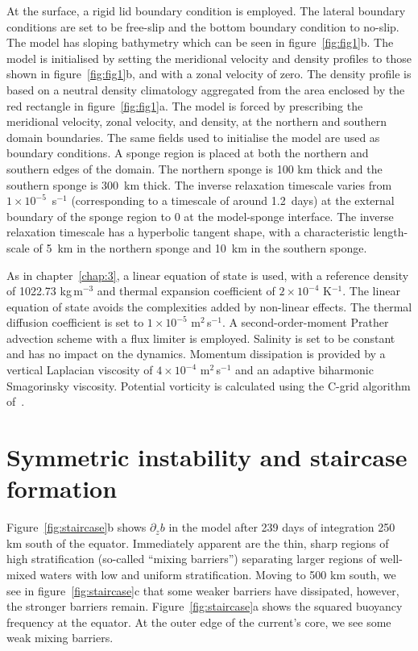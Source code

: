 At the surface, a rigid lid boundary condition is employed. The lateral boundary conditions are set to be free-slip and the bottom boundary condition to no-slip. The model has sloping bathymetry which can be seen in figure~\ref{fig:fig1}b. The model is initialised by setting the meridional velocity and density profiles to those shown in figure~\ref{fig:fig1}b, and with a zonal velocity of zero. The density profile is based on a neutral density climatology aggregated from the area enclosed by the red rectangle in figure~\ref{fig:fig1}a. The model is forced by prescribing the meridional velocity, zonal velocity, and density, at the northern and southern domain boundaries. The same fields used to initialise the model are used as boundary conditions. A sponge region is placed at both the northern and southern edges of the domain. The northern sponge is 100 km thick and the southern sponge is 300~km thick. The inverse relaxation timescale varies from $1\times 10^{-5}$~s$^{-1}$ (corresponding to a timescale of around 1.2~days) at the external boundary of the sponge region to 0 at the model-sponge interface. The inverse relaxation timescale has a hyperbolic tangent shape, with a characteristic length-scale of 5~km in the northern sponge and 10~km in the southern sponge.

As in chapter~\ref{chap:3}, a linear equation of state is used, with a reference density of 1022.73 kg\,m$^{-3}$ and thermal expansion coefficient of $2 \times 10^{-4}$ K$^{-1}$. The linear equation of state avoids the complexities added by non-linear effects. The thermal diffusion coefficient is set to $1 \times 10^{-5}$ m$^{2}$\,s$^{-1}$. A second-order-moment Prather advection scheme with a flux limiter is employed. Salinity is set to be constant and has no impact on the dynamics. Momentum dissipation is provided by a vertical Laplacian viscosity of $4 \times 10^{-4}$ m$^{2}$\,s$^{-1}$ and an adaptive biharmonic Smagorinsky viscosity. Potential vorticity is calculated using the C-grid algorithm of~\citet{Morel2019}.

\section{Symmetric instability and staircase formation}
\label{sec:randd}
Figure~\ref{fig:staircase}b shows $\partial_z b$ in the model after 239 days of integration 250 km south of the equator. Immediately apparent are the thin, sharp regions of high stratification (so-called ``mixing barriers'') separating larger regions of well-mixed waters with low and uniform stratification. Moving to 500 km south, we see in figure~\ref{fig:staircase}c that some weaker barriers have dissipated, however, the stronger barriers remain. Figure~\ref{fig:staircase}a shows the squared buoyancy frequency at the equator. At the outer edge of the current's core, we see some weak mixing barriers.

